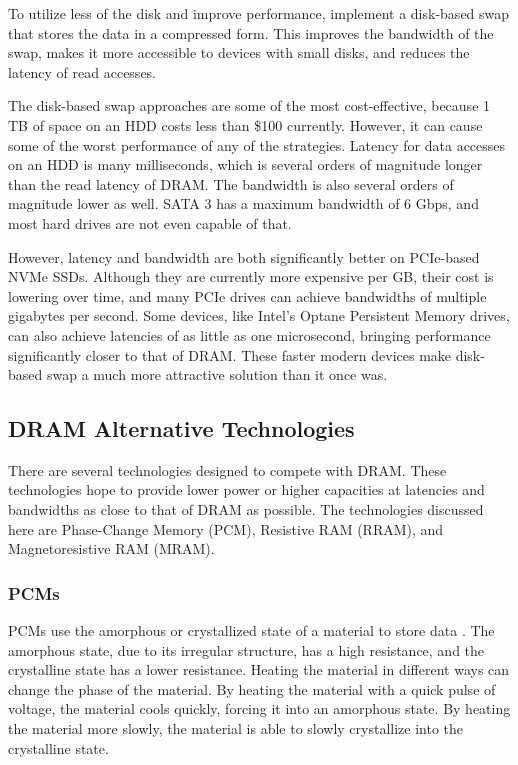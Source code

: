 \documentclass[doublespace,nopageskip]{VTthesis}
\begin{document}
To utilize less of the disk and improve performance, \cite{diskswapcompression, resurrectswapcompression} implement a disk-based swap that stores the data in a compressed form. This improves the bandwidth of the swap, makes it more accessible to devices with small disks, and reduces the latency of read accesses.

The disk-based swap approaches are some of the most cost-effective, because 1 TB of space on an HDD costs less than \$100 currently. However, it can cause some of the worst performance of any of the strategies. Latency for data accesses on an HDD is many milliseconds, which is several orders of magnitude longer than the read latency of DRAM. The bandwidth is also several orders of magnitude lower as well. SATA 3 has a maximum bandwidth of 6 Gbps, and most hard drives are not even capable of that.

However, latency and bandwidth are both significantly better on PCIe-based NVMe SSDs. Although they are currently more expensive per GB, their cost is lowering over time, and many PCIe drives can achieve bandwidths of multiple gigabytes per second. Some devices, like Intel's Optane Persistent Memory drives, can also achieve latencies of as little as one microsecond, bringing performance significantly closer to that of DRAM. These faster modern devices make disk-based swap a much more attractive solution than it once was.

\subsection{DRAM Alternative Technologies}\label{ss:dram_alternative_technologies}
There are several technologies designed to compete with DRAM. These technologies hope to provide lower power or higher capacities at latencies and bandwidths as close to that of DRAM as possible. The technologies discussed here are Phase-Change Memory (PCM), Resistive RAM (RRAM), and Magnetoresistive RAM (MRAM).

\subsubsection{PCMs}\label{sss:pcms}
PCMs use the amorphous or crystallized state of a material to store data \cite{pcm1, pcm2}. The amorphous state, due to its irregular structure, has a high resistance, and the crystalline state has a lower resistance. Heating the material in different ways can change the phase of the material. By heating the material with a quick pulse of voltage, the material cools quickly, forcing it into an amorphous state. By heating the material more slowly, the material is able to slowly crystallize into the crystalline state.
\end{document}
